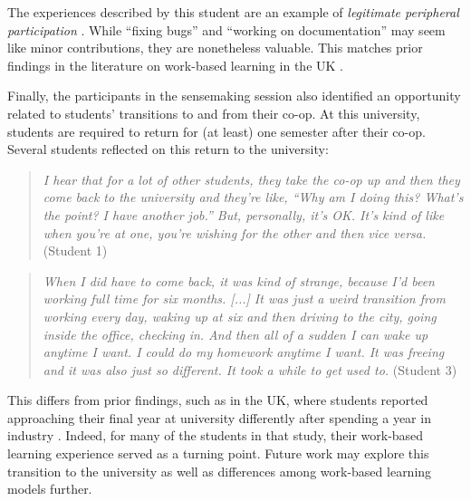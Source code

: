 \documentclass{article}
\begin{document}
The experiences described by this student are an example of \textit{legitimate peripheral participation} \cite{laveSituatedLearningLegitimate1991}. While “fixing bugs” and “working on documentation” may seem like minor contributions, they are nonetheless valuable. This matches prior findings in the literature on work-based learning in the UK \cite{dziallasLearningContextFirst2021a}.

Finally, the participants in the sensemaking session also identified an opportunity related to students’ transitions to and from their co-op. At this university, students are required to return for (at least) one semester after their co-op. Several students reflected on this return to the university:


\begin{quote}
    \textit{I hear that for a lot of other students, they take the co-op up and then they come back to the university and they're like, “Why am I doing this? What's the point? I have another job.” But, personally, it's OK. It's kind of like when you're at one, you're wishing for the other and then vice versa.} (Student 1)
\end{quote}

\begin{quote}
    \textit{When I did have to come back, it was kind of strange, because I'd been working full time for six months. [...] It was just a weird transition from working every day, waking up at six and then driving to the city, going inside the office, checking in. And then all of a sudden I can wake up anytime I want. I could do my homework anytime I want. It was freeing and it was also just so different. It took a while to get used to.} (Student 3)
\end{quote}


This differs from prior findings, such as in the UK, where students reported approaching their final year at university differently after spending a year in industry \cite{dziallasAspectsGraduatenessComputing2016}. Indeed, for many of the students in that study, their work-based learning experience served as a turning point. Future work may explore this transition to the university as well as differences among work-based learning models further.
\end{document}
